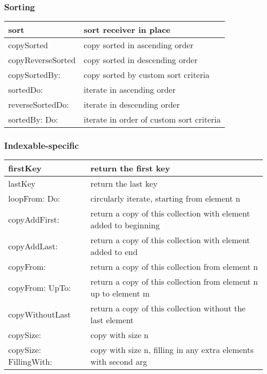 \documentclass[letterpaper,10pt,english]{sphinxmanual}
\begin{document}
\subsubsection{Sorting}
\label{\detokenize{usefulselectors:sorting}}
\noindent\begin{tabulary}{\linewidth}{p{5cm} p{10cm}}
\hline

sort
&
sort receiver in place
\\
\hline
copySorted
&
copy sorted in ascending order
\\
\hline
copyReverseSorted
&
copy sorted in descending order
\\
\hline
copySortedBy:
&
copy sorted by custom sort criteria
\\
\hline
sortedDo:
&
iterate in ascending order
\\
\hline
reverseSortedDo:
&
iterate in descending order
\\
\hline
sortedBy: Do:
&
iterate in order of custom sort criteria
\\
\hline\end{tabulary}



\subsubsection{Indexable-specific}
\label{\detokenize{usefulselectors:indexable-specific}}
\noindent\begin{tabulary}{\linewidth}{p{5cm} p{10cm}}
\hline

firstKey
&
return the first key
\\
\hline
lastKey
&
return the last key
\\
\hline
loopFrom: Do:
&
circularly iterate, starting from element n
\\
\hline
copyAddFirst:
&
return a copy of this collection with element added to beginning
\\
\hline
copyAddLast:
&
return a copy of this collection with element added to end
\\
\hline
copyFrom:
&
return a copy of this collection from element n
\\
\hline
copyFrom: UpTo:
&
return a copy of this collection from element n up to element m
\\
\hline
copyWithoutLast
&
return a copy of this collection without the last element
\\
\hline
copySize:
&
copy with size n
\\
\hline
copySize: FillingWith:
&
copy with size n, filling in any extra elements with second arg
\\
\hline\end{tabulary}
\end{document}
